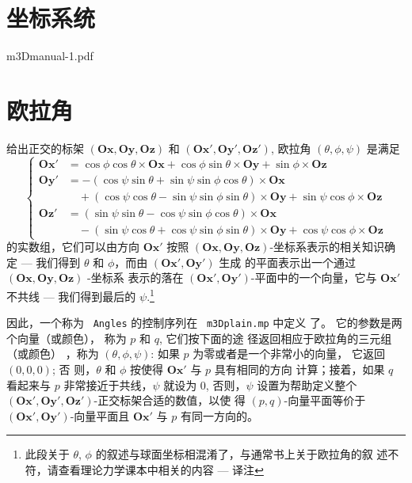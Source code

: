 \documentclass[a4paper,12pt]{article}
\begin{document}
\section{坐标系统}
\centerline{\XeTeXpdffile m3Dmanual-1.pdf}
  
\section{欧拉角}
给出正交的标架 $(\mathbf{Ox},\mathbf{Oy},\mathbf{Oz})$  和
$(\mathbf{Ox}',\mathbf{Oy}',\mathbf{Oz}')$, 欧拉角
$(\theta,\phi,\psi)$ 是满足
$$
\left\{
  \begin{array}{lll}
  \mathbf{Ox'}&=\cos\phi\cos\theta\times\mathbf{Ox}+\cos\phi\sin\theta 
\times\mathbf{Oy}+\sin\phi\times\mathbf{Oz}\\
  \mathbf{Oy'}&=-(\cos\psi\sin\theta+\sin\psi\sin\phi\cos\theta)
\times\mathbf{Ox}\\
              &\quad +(\cos\psi\cos\theta-\sin\psi\sin\phi\sin\theta)
  \times\mathbf{Oy}+\sin\psi\cos\phi\times\mathbf{Oz}\\
  \mathbf{Oz'}&=(\sin\psi\sin\theta-\cos\psi\sin\phi\cos\theta)
  \times\mathbf{Ox}\\ 
  &\quad-(\sin\psi\cos\theta+\cos\psi\sin\phi\sin\theta)\times\mathbf{Oy}  
 +\cos\psi\cos\phi\times\mathbf{Oz}
\end{array}
  \right.
  $$
 的实数组，它们可以由方向 $\mathbf{Ox}'$ 按照
 $(\mathbf{Ox},\mathbf{Oy},\mathbf{Oz})$-坐标系表示的相关知识确定 ---
 我们得到 $\theta$ 和 $\phi$，而由 $(\mathbf{Ox}',\mathbf{Oy}')$ 生成
 的平面表示出一个通过  $(\mathbf{Ox},\mathbf{Oy},\mathbf{Oz})$ -坐标系 
 表示的落在  $(\mathbf{Ox'},\mathbf{Oy'})$-平面中的一个向量，它与
 $\mathbf{Ox}'$ 不共线 --- 我们得到最后的  $\psi$.\footnote{此段关于
   $\theta$, $\phi$ 的叙述与球面坐标相混淆了，与通常书上关于欧拉角的叙  
   述不符，请查看理论力学课本中相关的内容 --- 译注} 

   
  因此，一个称为 ~{\tt Angles} 的控制序列在 ~{\tt m3Dplain.mp} 中定义
  了。 它的参数是两个向量（或颜色）， 称为 $p$ 和 $q$, 它们按下面的途
  径返回相应于欧拉角的三元组（或颜色） ，称为 $(\theta,\phi,\psi)$:
  如果   $p$ 为零或者是一个非常小的向量， 它返回 $(0,0,0)$; 否
  则，$\theta$   和 $\phi$ 按使得 $\mathbf{Ox}'$ 与 $p$ 具有相同的方向  
  计算；接着，如果 $q$ 看起来与 $p$  非常接近于共线，$\psi$ 就设为 
  $0$, 否则，$\psi$ 设置为帮助定义整个
  $(\mathbf{Ox}',\mathbf{Oy}',\mathbf{Oz}')$-正交标架合适的数值，以使
  得 $(p,q)$-向量平面等价于 $(\mathbf{Ox}',\mathbf{Oy}')$-向量平面且
  $\mathbf{Ox}'$ 与 $p$ 有同一方向的。  
  
\end{document}
